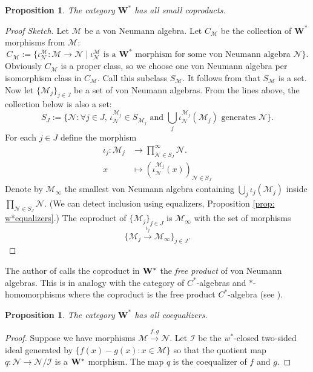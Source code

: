 \documentclass[12pt]{article}
\newtheorem{proposition}[theorem]{Proposition}
\theoremstyle{definition}
\newenvironment{remark}
  {\pushQED{\qed}\renewcommand{\qedsymbol}{\textcircled{\tiny R}}\remarkx}
  {\popQED\endremarkx}
\newcommand{\mc}[1]{\mathcal{#1}}
\newcommand{\<}{\langle}
\renewcommand{\>}{\rangle}
\begin{document}
\begin{proposition} 
    The category $\mathbf{W^*}$ has all small coproducts.
\end{proposition}
\begin{proof}[Proof Sketch]
    Let $\mc M$ be a von Neumann algebra. Let $C_{\mc M}$ be the collection of $\mathbf{W^*}$ morphisms from $\mc M$:
    \[
    C_{\mc M} := \{\iota^{\mc M}_{\mc N}: \mc M \to \mc N\mid \iota^{\mc M}_{\mc N} \text{ is a $\mathbf{W^*}$ morphism for some von Neumann algebra $\mc N$}\}.
    \]
    Obviously $C_{\mc M}$ is a proper class, so we choose one von Neumann algebra per isomorphism class in $C_{\mc M}$. Call this subclass $S_{\mc M}$. It follows from \cite[Lemma 5.4]{kornell} that $S_{\mc M}$ is a set. Now let $\{\mc M_j\}_{j \in J}$ be a set of von Neumann algebras. From the lines above, the collection below is also a set:
    \[
    S_J := \bigg\{\mc N : \forall j \in J, \, \iota_{\mc N}^{\mc M_j} \in S_{\mc M_j} \text{ and } \bigcup_j \iota_{\mc N}^{\mc M_j} (\mc M_j) \text{ generates $\mc N$} \bigg\}.
    \]
    For each $j \in J$ define the morphism
    \begin{align*}
    \iota_j : \mc M_j &\to \prod_{\mc N \in S_J}^{\infty} \mc N. \\
    x &\mapsto (\iota_{\mc N}^{\mc M_j}(x))_{\mc N \in S_J}
    \end{align*}
    Denote by $\mc M_\infty$ the smallest von Neumann algebra containing $\bigcup_j \iota_j(\mc M_j)$ inside $\prod_{\mc N \in S_J} \mc N$. (We can detect inclusion using equalizers, Proposition \ref{prop: w*equalizers}.) The coproduct of $\{\mc M_j\}_{j \in J}$ is $\mc M_\infty$ with the set of morphisms
    \[
    \{\mc M_j \overset{\iota_j}{\to} \mc M_\infty\}_{j \in J}.
    \]
\end{proof}

\begin{remark} \label{rmk: free product vna}
    The author of \cite{kornell} calls the coproduct in ${\bf{W^*}}$ the \textit{free product} of von Neumann algebras. This is in analogy with the category of $C^*$-algebras and $*$-homomorphisms where the coproduct is the free product $C^*$-algebra (see \cite[Section 2]{pedersen-free-product}). 
\end{remark}

\begin{proposition} 
    The category $\mathbf{W^*}$ has all coequalizers.
\end{proposition}
\begin{proof}
    Suppose we have morphisms $\mc M \overset{f,g}{\to} \mc N$. Let $\mc I$ be the $w^*$-closed two-sided ideal generated by $\{f(x)- g(x) : x \in \mc M\}$ so that the quotient map $q: \mc N \to \mc N/\mc I$ is a ${\bf {W^*}}$ morphism. The map $q$ is the coequalizer of $f$ and $g$. 
\end{proof}
\end{document}
